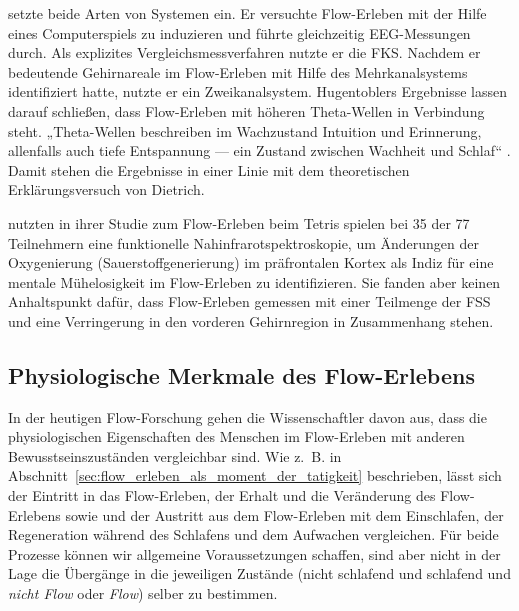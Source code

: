 \citet{Hugentobler2011} setzte beide Arten von Systemen ein. Er versuchte Flow-Erleben mit der Hilfe eines Computerspiels zu induzieren und führte gleichzeitig \ac{EEG}-Messungen durch. Als explizites Vergleichsmessverfahren nutzte er die \ac{FKS}. Nachdem er bedeutende Gehirnareale im Flow-Erleben mit Hilfe des Mehrkanalsystems identifiziert hatte, nutzte er ein Zweikanalsystem. Hugentoblers Ergebnisse lassen darauf schließen, dass Flow-Erleben mit höheren Theta-Wellen in Verbindung steht. „Theta-Wellen beschreiben im Wachzustand Intuition und Erinnerung, allenfalls auch tiefe Entspannung — ein Zustand zwischen Wachheit und Schlaf“ \citep[S.~149]{Hugentobler2011}. Damit stehen die Ergebnisse in einer Linie mit dem theoretischen Erklärungsversuch von Dietrich.

\citet{Harmat2015} nutzten in ihrer Studie zum Flow-Erleben beim Tetris spielen bei 35 der 77 Teilnehmern eine funktionelle Nahinfrarotspektroskopie, um Änderungen der Oxygenierung (Sauerstoffgenerierung) im präfrontalen Kortex als Indiz für eine mentale Mühelosigkeit im Flow-Erleben zu identifizieren. Sie fanden aber keinen Anhaltspunkt dafür, dass Flow-Erleben gemessen mit einer Teilmenge der \ac{FSS} und eine Verringerung in den vorderen Gehirnregion in Zusammenhang stehen.

\subsection{Physiologische Merkmale des Flow-Erlebens} 

\label{sub:physiologische_merkmale_des_flow_erlebens}

In der heutigen Flow-Forschung gehen die Wissenschaftler davon aus, dass die physiologischen Eigenschaften des Menschen im Flow-Erleben mit anderen Bewusstseinszuständen vergleichbar sind. Wie z.~B. in Abschnitt~\ref{sec:flow_erleben_als_moment_der_tatigkeit} beschrieben, lässt sich der Eintritt in das Flow-Erleben, der Erhalt und die Veränderung des Flow-Erlebens sowie und der Austritt aus dem Flow-Erleben mit dem Einschlafen, der Regeneration während des Schlafens und dem Aufwachen vergleichen. Für beide Prozesse können wir allgemeine Voraussetzungen schaffen, sind aber nicht in der Lage die Übergänge in die jeweiligen Zustände (nicht schlafend und schlafend und \emph{nicht Flow} oder \emph{Flow}) selber zu bestimmen.

